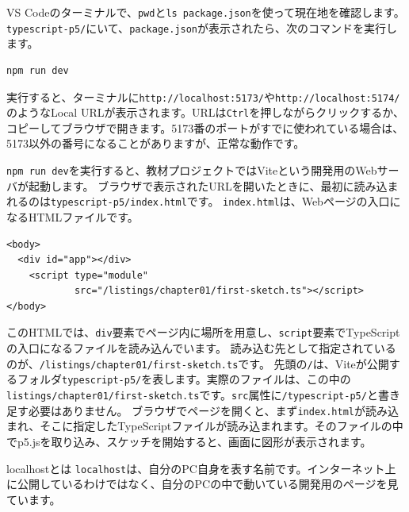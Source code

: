VS Codeのターミナルで、\texttt{pwd}と\texttt{ls package.json}を使って現在地を確認します。
\texttt{typescript-p5/}にいて、\texttt{package.json}が表示されたら、次のコマンドを実行します。

\begin{listing}[htbp]
\begin{verbatim}
npm run dev
\end{verbatim}
\caption{開発サーバを起動するコマンド}
\label{lst:chapter01-npm-run-dev}
\end{listing}

実行すると、ターミナルに\texttt{http://localhost:5173/}や\texttt{http://localhost:5174/}のようなLocal URLが表示されます。URLは\texttt{Ctrl}を押しながらクリックするか、コピーしてブラウザで開きます。5173番のポートがすでに使われている場合は、5173以外の番号になることがありますが、正常な動作です。

\texttt{npm run dev}を実行すると、教材プロジェクトではViteという開発用のWebサーバが起動します。
ブラウザで表示されたURLを開いたときに、最初に読み込まれるのは\texttt{typescript-p5/index.html}です。
\texttt{index.html}は、Webページの入口になるHTMLファイルです。

\begin{listing}[htbp]
\begin{verbatim}
<body>
  <div id="app"></div>
    <script type="module"
            src="/listings/chapter01/first-sketch.ts"></script>
</body>
\end{verbatim}
\caption{\texttt{index.html}から最初のサンプルを読み込む部分}
\label{lst:chapter01-index-html-main-ts}
\end{listing}

このHTMLでは、\texttt{div}要素でページ内に場所を用意し、\texttt{script}要素でTypeScriptの入口になるファイルを読み込んでいます。
読み込む先として指定されているのが、\texttt{/listings/chapter01/first-sketch.ts}です。
先頭の\texttt{/}は、Viteが公開するフォルダ\texttt{typescript-p5/}を表します。実際のファイルは、この中の\texttt{listings/chapter01/first-sketch.ts}です。\texttt{src}属性に\texttt{/typescript-p5/}と書き足す必要はありません。
ブラウザでページを開くと、まず\texttt{index.html}が読み込まれ、そこに指定したTypeScriptファイルが読み込まれます。そのファイルの中でp5.jsを取り込み、スケッチを開始すると、画面に図形が表示されます。

\begin{pointbox}{localhostとは}
\texttt{localhost}は、自分のPC自身を表す名前です。インターネット上に公開しているわけではなく、自分のPCの中で動いている開発用のページを見ています。
\end{pointbox}

